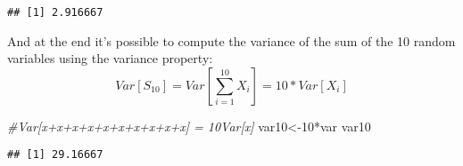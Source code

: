 \documentclass[
]{article}
\newenvironment{Shaded}{\begin{snugshade}}{\end{snugshade}}
\newcommand{\CommentTok}[1]{\textcolor[rgb]{0.56,0.35,0.01}{\textit{#1}}}
\newcommand{\DecValTok}[1]{\textcolor[rgb]{0.00,0.00,0.81}{#1}}
\newcommand{\NormalTok}[1]{#1}
\newcommand{\OtherTok}[1]{\textcolor[rgb]{0.56,0.35,0.01}{#1}}
\newcommand{\SpecialCharTok}[1]{\textcolor[rgb]{0.00,0.00,0.00}{#1}}
\begin{document}
\begin{verbatim}
## [1] 2.916667
\end{verbatim}

And at the end it's possible to compute the variance of the sum of the
10 random variables using the variance property:
\[Var[S_{10}]=Var[\sum_{i=1}^{10}{X_i}]=10*Var[X_i]\]

\begin{Shaded}
\begin{Highlighting}[]
\CommentTok{\#Var[x+x+x+x+x+x+x+x+x+x] = 10Var[x]}
\NormalTok{var10}\OtherTok{\textless{}{-}}\DecValTok{10}\SpecialCharTok{*}\NormalTok{var}
\NormalTok{var10}
\end{Highlighting}
\end{Shaded}

\begin{verbatim}
## [1] 29.16667
\end{verbatim}
\end{document}
